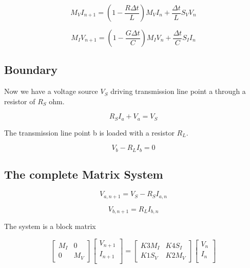 \documentclass[12pt, letterpaper]{article}
\begin{document}
\begin{equation}
	M_V I_{n+1} = (1 - \frac{R \Delta t}{L}) M_V I_n + \frac{\Delta t}{L} S_V V_n
\end{equation}

\begin{equation}
	M_I V_{n+1}
	= (1 - \frac{G \Delta t}{C}) M_I V_n + \frac{\Delta t}{C} S_I I_n 
\end{equation}


\subsection{Boundary}
Now we have a voltage source $V_S$ driving transmission line point a through a resistor of $R_S$ ohm.

\begin{equation}
R_S I_a + V_a = V_S
\end{equation}

The transmission line point b is loaded with a resistor $R_L$.

\begin{equation}
V_b - R_L I_b = 0
\end{equation}


\subsection{The complete Matrix System}


\begin{equation}
	V_{a,n+1} = V_S - R_S I_{a,n}
\end{equation}

\begin{equation}
	V_{b,n+1} = R_L I_{b,n}
\end{equation}


The system is a block matrix 

\begin{equation}
	\begin{bmatrix}
		M_I & 0 \\
		0   & M_V
	\end{bmatrix}
	\begin{bmatrix}
		V_{n+1} \\
		I_{n+1} \\
	\end{bmatrix}
	=
	\begin{bmatrix}
	K3 M_I & K4 S_I\\
	K1 S_V & K2 M_V
		
	\end{bmatrix}
	\begin{bmatrix}
		V_{n} \\
		I_{n} \\
	\end{bmatrix}
\end{equation}
\end{document}
